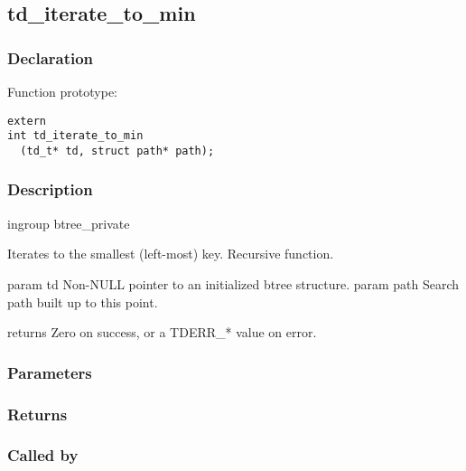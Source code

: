 
\newpage
\subsection{td\_iterate\_to\_min}
\subsubsection{Declaration} Function prototype:

\begin{verbatim}
extern
int td_iterate_to_min
  (td_t* td, struct path* path);
\end{verbatim}

\subsubsection{Description}

 
 ingroup btree\_private 

 Iterates to the smallest (left-most) key.
 Recursive function.

 param td Non-NULL pointer to an initialized btree structure.
 param path Search path built up to this point.

 returns Zero on success, or a TDERR\_* value on error.
 

\subsubsection{Parameters}
\subsubsection{Returns}
\subsubsection{Called by}
